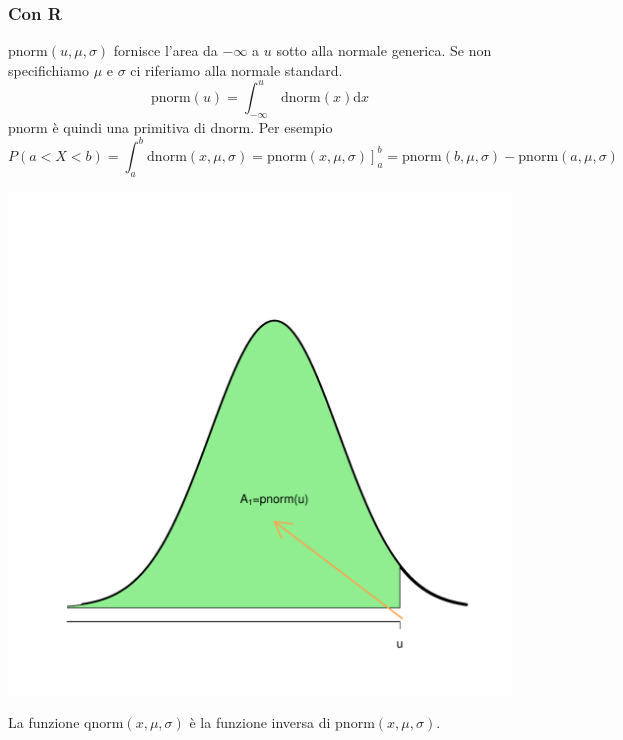\documentclass[onecolumn,12pt]{book}\usepackage[]{graphicx}\usepackage[]{color}
\makeatletter
\def\maxwidth{ %
  \ifdim\Gin@nat@width>\linewidth
    \linewidth
  \else
    \Gin@nat@width
  \fi
}
\newenvironment{knitrout}{}{} %
\newcommand{\rpr}{\textsf{R}~}
\makeatother
\begin{document}
 


 

\subsubsection{Con \rpr}

$\mathrm{pnorm}(u,\mu,\sigma)$ fornisce l'area da  $-\infty$ a $u$ sotto alla normale generica. Se non specifichiamo $\mu$ e $\sigma$ ci riferiamo alla normale standard.
$$\mathrm{pnorm}(u)= \int_{-\infty}^u\, \mathrm{dnorm}(x)\mathrm{d} x $$
$\mathrm{pnorm}$  è  quindi una primitiva di $\mathrm{dnorm}$. Per esempio
$$ P(a<X<b)=\int_a^b \mathrm {dnorm}(x,\mu,\sigma)=\left.\mathrm {pnorm}(x,\mu,\sigma)\right]_a^b=\mathrm {pnorm}(b,\mu,\sigma)-\mathrm {pnorm}(a,\mu,\sigma)$$

\begin{knitrout}
\color{fgcolor}
\includegraphics[width=\maxwidth]{figure/unnamed-chunk-34-1} 

\end{knitrout}




La funzione $\mathrm{qnorm}(x,\mu,\sigma)$ è  la funzione inversa di $\mathrm {pnorm}(x,\mu,\sigma)$.
\end{document}
